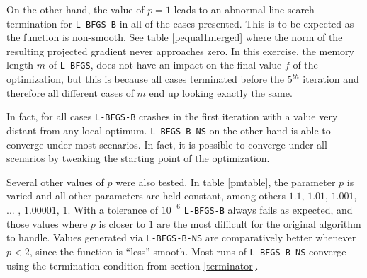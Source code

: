 On the other hand, the value of $p = 1$ leads to an abnormal line search termination for \texttt{L-BFGS-B} in all of the cases presented. This is to be expected as the function is non-smooth. See table \ref{pequal1merged} where the norm of the resulting projected gradient never approaches zero. In this exercise, the memory length $m$ of \texttt{L-BFGS}, does not have an impact on the final value $f$ of the optimization, but this is because all cases terminated before the $5^{th}$ iteration and therefore all different cases of $m$ end up looking exactly the same.

In fact, for all cases \texttt{L-BFGS-B} crashes in the first iteration with a value very distant from any local optimum.  \texttt{L-BFGS-B-NS} on the other hand is able to converge under most scenarios. In fact, it is possible to converge under all scenarios by tweaking the starting point of the optimization.

Several other values of $p$ were also tested. In table \ref{pmtable}, the parameter $p$ is varied and all other parameters are held constant, among others $1.1$, $1.01$, $1.001$, ... , $1.00001$, $1$. With a tolerance of $10^{-6}$ \texttt{L-BFGS-B} always fails as expected, and those values where $p$ is closer to $1$ are the most difficult for the original algorithm to handle.  Values generated via \texttt{L-BFGS-B-NS} are comparatively better whenever $p < 2$, since the function is ``less'' smooth. Most runs of \texttt{L-BFGS-B-NS} converge using the termination condition from section \ref{terminator}.

